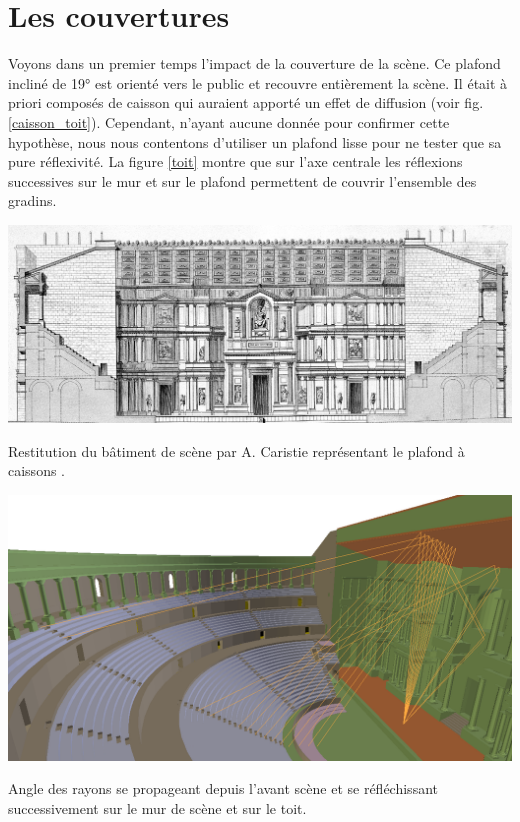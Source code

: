 \section{Les couvertures}
Voyons dans un premier temps l'impact de la couverture de la scène. Ce plafond incliné de 19° est orienté vers le public et recouvre entièrement la scène. Il était à priori composés de caisson qui auraient apporté un effet de diffusion (voir fig. \ref{caisson_toit}). Cependant, n'ayant aucune donnée pour confirmer cette hypothèse, nous nous contentons d'utiliser un plafond lisse pour ne tester que sa pure réflexivité. La figure \ref{toit} montre que sur l'axe centrale les réflexions successives sur le mur et sur le plafond permettent de couvrir l'ensemble des gradins.
\begin{figureth}
	\includegraphics[width=\linewidth]{images/caisson_toit}
	\caption[Restitution du bâtiment de scène par A. Caristie représentant le plafond à caissons.]{Restitution du bâtiment de scène par A. Caristie représentant le plafond à caissons \footnotemark.}
	\label{caisson_toit}
\end{figureth}
%
\begin{figureth}
	\includegraphics[width=\linewidth]{images/toit}
	\caption{Angle des rayons se propageant depuis l'avant scène et se réfléchissant successivement sur le mur de scène et sur le toit.}
	\label{toit}
\end{figureth}
